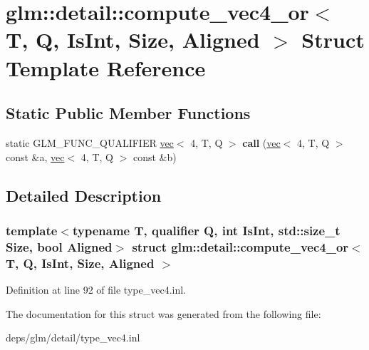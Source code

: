 \hypertarget{structglm_1_1detail_1_1compute__vec4__or}{}\section{glm\+:\+:detail\+:\+:compute\+\_\+vec4\+\_\+or$<$ T, Q, Is\+Int, Size, Aligned $>$ Struct Template Reference}
\label{structglm_1_1detail_1_1compute__vec4__or}
\subsection*{Static Public Member Functions}
\begin{DoxyCompactItemize}
\item 
\mbox{\label{structglm_1_1detail_1_1compute__vec4__or_a6d52ef76bd8362c6325edf1eb38a8d65}} 
static G\+L\+M\+\_\+\+F\+U\+N\+C\+\_\+\+Q\+U\+A\+L\+I\+F\+I\+ER \hyperlink{structglm_1_1vec}{vec}$<$ 4, T, Q $>$ {\bfseries call} (\hyperlink{structglm_1_1vec}{vec}$<$ 4, T, Q $>$ const \&a, \hyperlink{structglm_1_1vec}{vec}$<$ 4, T, Q $>$ const \&b)
\end{DoxyCompactItemize}


\subsection{Detailed Description}
\subsubsection*{template$<$typename T, qualifier Q, int Is\+Int, std\+::size\+\_\+t Size, bool Aligned$>$\newline
struct glm\+::detail\+::compute\+\_\+vec4\+\_\+or$<$ T, Q, Is\+Int, Size, Aligned $>$}



Definition at line 92 of file type\+\_\+vec4.\+inl.



The documentation for this struct was generated from the following file\+:\begin{DoxyCompactItemize}
\item 
deps/glm/detail/type\+\_\+vec4.\+inl\end{DoxyCompactItemize}
